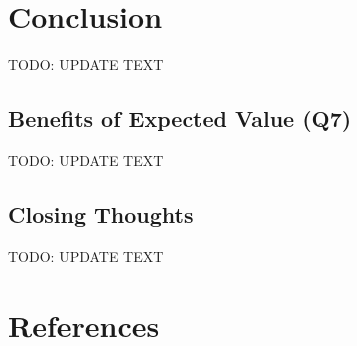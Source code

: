 \documentclass[
	letterpaper, %
]{jdf}
\begin{document}
\section{Conclusion}
TODO: UPDATE TEXT

\subsection{Benefits of Expected Value (Q7)}
TODO: UPDATE TEXT

\subsection{Closing Thoughts}
TODO: UPDATE TEXT \citep{Martingale} \citep{Roulette}

\section{References}
\printbibliography[heading=none]
\end{document}
